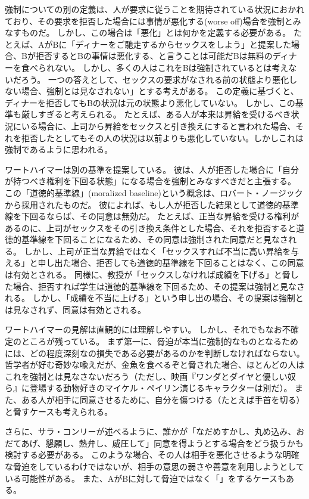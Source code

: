 \documentclass[paper=a4,book,openany]{jlreq} \usepackage{mystyle}
\begin{document}
強制についての別の定義は、人が要求に従うことを期待されている状況におかれており、その要求を拒否した場合には事情が悪化する(worse off)場合を強制とみなすものだ。
しかし、この場合は「悪化」とは何かを定義する必要がある。
たとえば、AがBに「ディナーをご馳走するからセックスをしよう」と提案した場合、Bが拒否するとBの事情は悪化する、と言うことは可能だ{\DDASH}Bは無料のディナーを食べられない。
しかし、多くの人はこれをBは強制されているとは考えないだろう。
一つの答えとして、セックスの要求がなされる前の状態より悪化しない場合、強制とは見なされない」とする考えがある。
この定義に基づくと、ディナーを拒否してもBの状況は元の状態より悪化していない。
しかし、この基準も厳しすぎると考えられる。
たとえば、ある人が本来は昇給を受けるべき状況にいる場合に、上司から昇給をセックスと引き換えにすると言われた場合、それを拒否したとしてもその人の状況は以前よりも悪化していない。しかしこれは強制であるように思われる。

ワートハイマーは別の基準を提案している。
彼は、人が拒否した場合に「自分が持つべき権利を下回る状態」になる場合を強制とみなすべきだと主張する。
この「道徳的基準線」(moralized baseline)という概念は、ロバート・ノージックから採用されたものだ。
彼によれば、もし人が拒否した結果として道徳的基準線を下回るならば、その同意は無効だ\citep[pp. 167--169]{wertheimer03:_consen_sexual_relat}。
たとえば、正当な昇給を受ける権利があるのに、上司がセックスをその引き換え条件とした場合、それを拒否すると道徳的基準線を下回ることになるため、その同意は強制された同意だと見なされる。
しかし、上司が正当な昇給ではなく「セックスすれば不当に高い昇給を与える」と申し出た場合、拒否しても道徳的基準線を下回ることはなく、この同意は有効とされる。
同様に、教授が「セックスしなければ成績を下げる」と脅した場合、拒否すれば学生は道徳的基準線を下回るため、その提案は強制と見なされる。
しかし、「成績を不当に上げる」という申し出の場合、その提案は強制とは見なされず、同意は有効とされる。

ワートハイマーの見解は直観的には理解しやすい。
しかし、それでもなお不確定のところが残っている。
まず第一に、脅迫が本当に強制的なものとなるためには、どの程度深刻なの損失である必要があるのかを判断しなければならない。
哲学者が好む奇妙な喩えだが、金魚を食べるぞと脅された場合、ほとんどの人はこれを強制とは見なさないだろう（ただし、映画『ワンダとダイヤと優しい奴ら』に登場する動物好きのマイケル・ペイリン演じるキャラクターは別だ）。
また、ある人が相手に同意させるために、自分を傷つける（たとえば手首を切る）と脅すケースも考えられる\citep[p.280]{husak06:_compl_guide_consen_sex}。

さらに、サラ・コンリーが述べるように、誰かが「なだめすかし、丸め込み、おだてあげ、懇願し、熱弁し、威圧して」同意を得ようとする場合をどう扱うかも検討する必要がある\citep[p.115]{conly04:seductionrapecoercion}。
このような場合、その人は相手を悪化させるような明確な脅迫をしているわけではないが、相手の意思の弱さや善意を利用しようとしている可能性がある。
また、AがBに対して脅迫ではなく「」をするケースもある。
\end{document}
